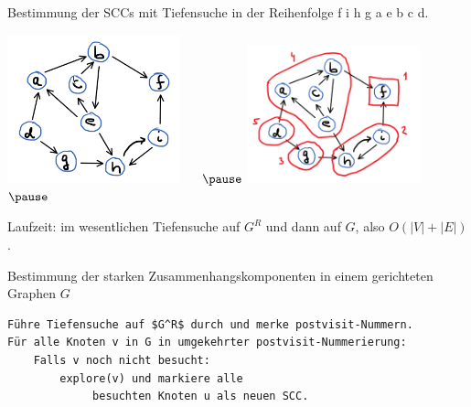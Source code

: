 \begin{frame}[fragile]
Bestimmung der SCCs mit Tiefensuche in der Reihenfolge  f i h g a e b c d.

\includegraphics[width=5cm]{bild20.png} ~~  $\pause$    
\includegraphics[width=5cm]{bild21.png} ~~  $\pause$   

Laufzeit: im wesentlichen Tiefensuche auf $G^R$ und dann auf $G$, also  $O(\left|V\right|+\left|E\right|)$.
\end{frame}

\begin{frame}[fragile]
Bestimmung der starken Zusammenhangskomponenten in einem gerichteten Graphen $G$
\begin{lstlisting} 
Führe Tiefensuche auf $G^R$ durch und merke postvisit-Nummern.
Für alle Knoten v in G in umgekehrter postvisit-Nummerierung:
	Falls v noch nicht besucht:
		explore(v) und markiere alle
			 besuchten Knoten u als neuen SCC.
             

\end{lstlisting} 
\end{frame}


